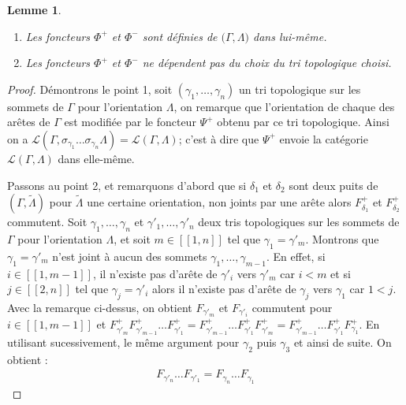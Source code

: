 \documentclass[a4paper,11pt]{article}
\newtheorem{lm}[thm]{Lemme}%
\begin{document}
\begin{lm}
\label{lem2}
  \begin{enumerate}
  \item Les foncteurs $\Phi^{+}$ et $\Phi^{-}$ sont définies de $\mathscr(\Gamma, \Lambda)$ dans lui-même.
  \item Les foncteurs $\Phi^{+}$ et $\Phi^{-}$ ne dépendent pas du choix du tri topologique choisi.
  \end{enumerate}
\end{lm}
\begin{proof}
  Démontrons le point 1, soit $(\gamma_{1}, \dots, \gamma_{n})$ un tri topologique sur les sommets de $\Gamma$ pour l'orientation $\Lambda$, on remarque que l'orientation de chaque des arêtes de $\Gamma$ est modifiée par le foncteur $\Psi^{+}$ obtenu par ce tri topologique. Ainsi on a $\mathscr L(\Gamma,\sigma_{\gamma_{1}} \dots \sigma_{\gamma_{n}}\Lambda) = \mathscr L(\Gamma,\Lambda)$; c'est à dire que $\Psi^{+}$ envoie la catégorie $\mathscr L(\Gamma,\Lambda)$ dans elle-même.

  Passons au point 2, et remarquons d'abord que si $\delta_{1}$ et $\delta_{2}$ sont deux puits de $(\Gamma,\widetilde \Lambda)$ pour $\widetilde \Lambda$ une certaine orientation, non joints par une arête alors $F^{+}_{\delta_{1}}$ et $F^{+}_{\delta_{2}}$ commutent. 
Soit $\gamma_{1}, \dots, \gamma_{n}$ et $\gamma'_{1}, \dots , \gamma'_{n}$ deux tris topologiques sur les sommets de $\Gamma$ pour l'orientation $\Lambda$, et soit $m \in [\![1,n]\!]$ tel que $\gamma_{1}= \gamma'_{m}$. Montrons que $\gamma_{1} = \gamma'_{m}$ n'est joint à aucun des sommets $\gamma_{1},\dots, \gamma_{m-1}$. En effet, si $i \in [\![1,m-1]\!]$, il n'existe pas d'arête de $\gamma'_{i}$ vers $\gamma'_{m}$ car $i<m$ et si $j \in [\![2,n]\!]$ tel que $\gamma_{j} = \gamma'_{i}$ alors il n'existe pas d'arête de $\gamma_{j}$ vers $\gamma_{1}$ car $1<j$. Avec la remarque ci-dessus, on obtient $F_{\gamma'_{m}}$ et $F_{\gamma'_{i}}$ commutent pour $i \in [\![1,m-1]\!]$ et $F^{+}_{\gamma'_{m}}F^{+}_{\gamma'_{m-1}}\dots F^{+}_{\gamma'_{1}} = F^{+}_{\gamma'_{m-1}}\dots F^{+}_{\gamma'_{1}} F^{+}_{\gamma'_{m}} = F^{+}_{\gamma'_{m-1}}\dots F^{+}_{\gamma'_{1}}F^{+}_{\gamma_{1}}$. En utilisant sucessivement, le même argument pour $\gamma_{2}$ puis $\gamma_{3}$ et ainsi de suite. On obtient : 
\begin{eqnarray*}%
  F_{\gamma'_{n}}\dots F_{\gamma'_{1}} = F_{\gamma_{n}} \dots F_{\gamma_{1}}
\end{eqnarray*}
\end{proof}
\end{document}
